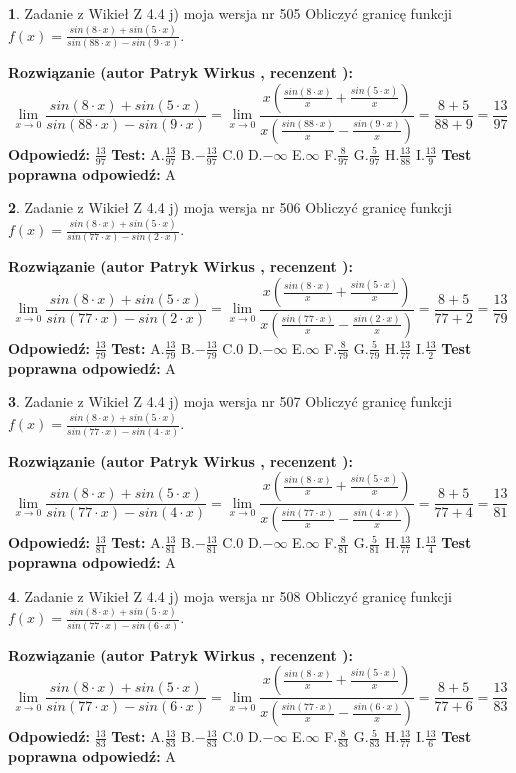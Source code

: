 \documentclass[12pt, a4paper]{article}
\theoremstyle{definition} %
\newtheorem{zad}{}
\newcommand{\zadStart}[1]{\begin{zad}#1\newline}
\newcommand{\zadStop}{\end{zad}}
\newcommand{\rozwStart}[2]{\noindent \textbf{Rozwiązanie (autor #1 , recenzent #2): }\newline}
\newcommand{\rozwStop}{\newline}
\newcommand{\odpStart}{\noindent \textbf{Odpowiedź:}\newline}
\newcommand{\odpStop}{\newline}
\newcommand{\testStart}{\noindent \textbf{Test:}\newline}
\newcommand{\testStop}{\newline}
\newcommand{\kluczStart}{\noindent \textbf{Test poprawna odpowiedź:}\newline}
\newcommand{\kluczStop}{\newline}
\begin{document}
\zadStart{Zadanie z Wikieł Z 4.4 j) moja wersja nr 505}
Obliczyć granicę funkcji $f(x)=\frac{sin(8\cdot x) +sin(5\cdot x)}{sin(88\cdot x) -sin(9\cdot x)}$.
\zadStop
\rozwStart{Patryk Wirkus}{}
$$\lim\limits_{x\to 0}\frac{sin(8\cdot x) +sin(5\cdot x)}{sin(88\cdot x) -sin(9\cdot x)}=\lim\limits_{x\to 0}\frac{x(\frac{sin(8\cdot x)}{x}+\frac{sin(5\cdot x)}{x})}{x(\frac{sin(88\cdot x)}{x}-\frac{sin(9\cdot x)}{x})}=\frac{8+5}{88+9} = \frac{13}{97}$$
\rozwStop
\odpStart
$\frac{13}{97}$
\odpStop
\testStart
A.$\frac{13}{97}$
B.$-\frac{13}{97}$
C.$0$
D.$-\infty$
E.$\infty$
F.$\frac{8}{97}$
G.$\frac{5}{97}$
H.$\frac{13}{88}$
I.$\frac{13}{9}$
\testStop
\kluczStart
A
\kluczStop



\zadStart{Zadanie z Wikieł Z 4.4 j) moja wersja nr 506}
Obliczyć granicę funkcji $f(x)=\frac{sin(8\cdot x) +sin(5\cdot x)}{sin(77\cdot x) -sin(2\cdot x)}$.
\zadStop
\rozwStart{Patryk Wirkus}{}
$$\lim\limits_{x\to 0}\frac{sin(8\cdot x) +sin(5\cdot x)}{sin(77\cdot x) -sin(2\cdot x)}=\lim\limits_{x\to 0}\frac{x(\frac{sin(8\cdot x)}{x}+\frac{sin(5\cdot x)}{x})}{x(\frac{sin(77\cdot x)}{x}-\frac{sin(2\cdot x)}{x})}=\frac{8+5}{77+2} = \frac{13}{79}$$
\rozwStop
\odpStart
$\frac{13}{79}$
\odpStop
\testStart
A.$\frac{13}{79}$
B.$-\frac{13}{79}$
C.$0$
D.$-\infty$
E.$\infty$
F.$\frac{8}{79}$
G.$\frac{5}{79}$
H.$\frac{13}{77}$
I.$\frac{13}{2}$
\testStop
\kluczStart
A
\kluczStop



\zadStart{Zadanie z Wikieł Z 4.4 j) moja wersja nr 507}
Obliczyć granicę funkcji $f(x)=\frac{sin(8\cdot x) +sin(5\cdot x)}{sin(77\cdot x) -sin(4\cdot x)}$.
\zadStop
\rozwStart{Patryk Wirkus}{}
$$\lim\limits_{x\to 0}\frac{sin(8\cdot x) +sin(5\cdot x)}{sin(77\cdot x) -sin(4\cdot x)}=\lim\limits_{x\to 0}\frac{x(\frac{sin(8\cdot x)}{x}+\frac{sin(5\cdot x)}{x})}{x(\frac{sin(77\cdot x)}{x}-\frac{sin(4\cdot x)}{x})}=\frac{8+5}{77+4} = \frac{13}{81}$$
\rozwStop
\odpStart
$\frac{13}{81}$
\odpStop
\testStart
A.$\frac{13}{81}$
B.$-\frac{13}{81}$
C.$0$
D.$-\infty$
E.$\infty$
F.$\frac{8}{81}$
G.$\frac{5}{81}$
H.$\frac{13}{77}$
I.$\frac{13}{4}$
\testStop
\kluczStart
A
\kluczStop



\zadStart{Zadanie z Wikieł Z 4.4 j) moja wersja nr 508}
Obliczyć granicę funkcji $f(x)=\frac{sin(8\cdot x) +sin(5\cdot x)}{sin(77\cdot x) -sin(6\cdot x)}$.
\zadStop
\rozwStart{Patryk Wirkus}{}
$$\lim\limits_{x\to 0}\frac{sin(8\cdot x) +sin(5\cdot x)}{sin(77\cdot x) -sin(6\cdot x)}=\lim\limits_{x\to 0}\frac{x(\frac{sin(8\cdot x)}{x}+\frac{sin(5\cdot x)}{x})}{x(\frac{sin(77\cdot x)}{x}-\frac{sin(6\cdot x)}{x})}=\frac{8+5}{77+6} = \frac{13}{83}$$
\rozwStop
\odpStart
$\frac{13}{83}$
\odpStop
\testStart
A.$\frac{13}{83}$
B.$-\frac{13}{83}$
C.$0$
D.$-\infty$
E.$\infty$
F.$\frac{8}{83}$
G.$\frac{5}{83}$
H.$\frac{13}{77}$
I.$\frac{13}{6}$
\testStop
\kluczStart
A
\kluczStop
\end{document}
